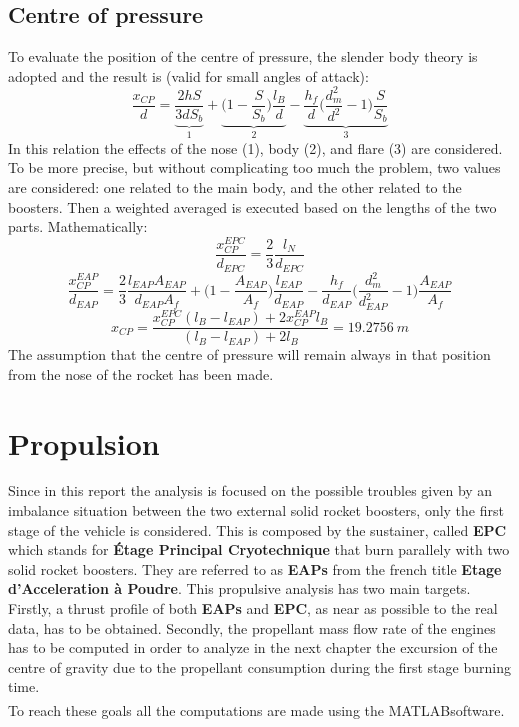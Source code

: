 \documentclass[12pt,fleqn,openany]{book} %
\begin{document}
\section{Centre of pressure}
To evaluate the position of the centre of pressure, the slender body theory is adopted and the result is (valid for small angles of attack): 
\begin{equation}
 \frac{x_{CP}}{d}=\underbrace{\frac{2hS}{3dS_b}}_{\text{1}}+\underbrace{\Biggl(1-\frac{S}{S_b}\Biggr)\frac{l_B}{d}}_{\text{2}}-\underbrace{\frac{h_f}{d}\Biggl(\frac{d^2_m}{d^2}-1\Biggr)\frac{S}{S_b}}_{\text{3}}
\end{equation}
In this relation the effects of the nose (1), body (2), and flare (3) are considered. To be more precise, but without complicating too much the problem, two values are considered: one related to the main body, and the other related to the boosters. Then a weighted averaged is executed based on the lengths of the two parts. Mathematically: 
\begin{equation}
 \frac{x^{EPC}_{CP}}{d_{EPC}}=\frac{2}{3}\frac{l_N}{d_{EPC}}
\end{equation}
\begin{equation}
 \frac{x_{CP}^{EAP}}{d_{EAP}}=\frac{2}{3}\frac{l_{EAP}A_{EAP}}{d_{EAP}A_f}+\Biggl(1-\frac{A_{EAP}}{A_f}\Biggr)\frac{l_{EAP}}{d_{EAP}}-\frac{h_f}{d_{EAP}}\Biggl(\frac{d^2_m}{d^2_{EAP}}-1\Biggr)\frac{A_{EAP}}{A_f}
\end{equation}
\begin{equation}
 x_{CP}=\frac{x_{CP}^{EPC}(l_B-l_{EAP})+2x_{CP}^{EAP}l_B}{(l_B-l_{EAP})+2l_B}=\SI{19.2756}{m}
\end{equation}
The assumption that the centre of pressure will remain always in that position from the nose of the rocket has been made. 


\chapter{Propulsion}
Since in this report the analysis is focused on the possible troubles given by an imbalance situation between the two external solid rocket boosters, only the first stage of the vehicle is considered. This is composed by the sustainer, called \textbf{EPC} which stands for \textbf{Étage Principal Cryotechnique} that burn parallely with two solid rocket boosters. They are referred to as \textbf{EAPs} from the french title \textbf{Etage d’Acceleration à Poudre}. This propulsive analysis has two main targets. Firstly, a thrust profile of both \textbf{EAPs} and \textbf{EPC}, as near as possible to the real data, has to be obtained. Secondly, the propellant mass flow rate of the engines has to be computed in order to analyze in the next chapter the excursion of the centre of gravity due to the propellant consumption during the first stage burning time.\\
To reach these goals all the computations are made using the MATLAB\textsuperscript\textregistered software. 
\end{document}
